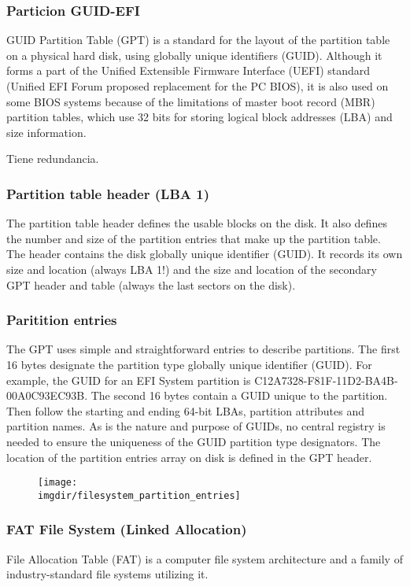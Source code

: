 \documentclass[a4paper, twoside]{article}
\newcommand{\imgdir}{../resources/images} %
\begin{document}
\subsubsection{Particion GUID-EFI}
GUID Partition Table (GPT) is a standard for the layout of the partition table on a physical hard disk, using globally unique identifiers (GUID). Although it forms a part of the Unified Extensible Firmware Interface (UEFI) standard (Unified EFI Forum proposed replacement for the PC BIOS), it is also used on some BIOS systems because of the limitations of master boot record (MBR) partition tables, which use 32 bits for storing logical block addresses (LBA) and size information.

Tiene redundancia.

\subsubsection{Partition table header (LBA 1)}
The partition table header defines the usable blocks on the disk. It also defines the number and size of the partition entries that make up the partition table. The header contains the disk globally unique identifier (GUID). It records its own size and location (always LBA 1!) and the size and location of the secondary GPT header and table (always the last sectors on the disk).

\subsubsection{Paritition entries}
The GPT uses simple and straightforward entries to describe partitions. The first 16 bytes designate the partition type globally unique identifier (GUID). For example, the GUID for an EFI System partition is C12A7328-F81F-11D2-BA4B-00A0C93EC93B. The second 16 bytes contain a GUID unique to the partition. Then follow the starting and ending 64-bit LBAs, partition attributes and partition names. As is the nature and purpose of GUIDs, no central registry is needed to ensure the uniqueness of the GUID partition type designators. The location of the partition entries array on disk is defined in the GPT header.

\begin{figure}[H]
	\centering
	\texttt{[image: \\imgdir/filesystem\_partition\_entries]}
	\label{fig:filesystem_partition_entries}
\end{figure}

\subsubsection{FAT File System (Linked Allocation)}
File Allocation Table (FAT) is a computer file system architecture and a family of industry-standard file systems utilizing it.
\end{document}
